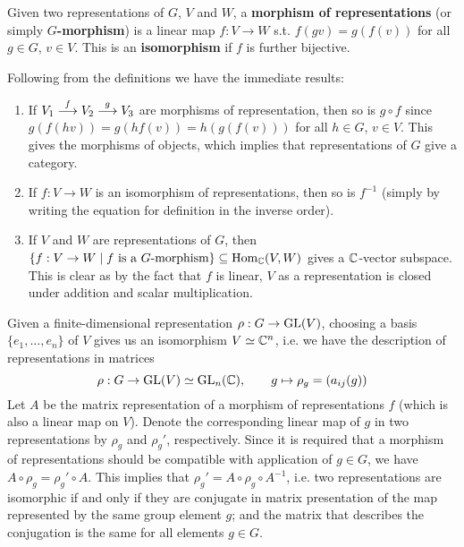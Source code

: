 \documentclass{article}
\begin{document}
\begin{definition}
    Given two representations of $G$, $V$ and $W$, a \textbf{morphism of representations} (or simply \textbf{$G$-morphism}) is a linear map $f: V \to W$ s.t. $f(gv) = g(f(v))$ for all $g \in G$, $v \in V$. This is an \textbf{isomorphism} if $f$ is further bijective.  
\end{definition}

\begin{remark}
    Following from the definitions we have the immediate results:
    \begin{enumerate}[label=\arabic*)]
        \item If $V_1 \overset{f}{\longrightarrow} V_2 \overset{g}{\longrightarrow} V_3$ are morphisms of representation, then so is $g \circ f$ since $g(f(hv)) = g(hf(v)) = h(g(f(v)))$ for all $h \in G$, $v \in V$. This gives the morphisms of objects, which implies that representations of $G$ give a category.
        \item If $f: V \to W$ is an isomorphism of representations, then so is $f^{-1}$ (simply by writing the equation for definition in the inverse order).
        \item If $V$ and $W$ are representations of $G$, then $\{ f : V \to W \mid f \text{ is a $G$-morphism} \} \subseteq \mathrm{Hom}_{\mathbb{C}}(V, W)$ gives a $\mathbb{C}$-vector subspace. This is clear as by the fact that $f$ is linear, $V$ as a representation is closed under addition and scalar multiplication.
    \end{enumerate}
\end{remark}

\begin{remark}\label{rmk: repr isom iff conjugate}
    Given a finite-dimensional representation $\rho: G \to \mathrm{GL}(V)$, choosing a basis $\{e_1, \dots, e_n\}$ of $V$ gives us an isomorphism $V \simeq \mathbb{C}^n$, i.e. we have the description of representations in matrices
    \[
        \rho: G \to \mathrm{GL}(V) \simeq \mathrm{GL}_n(\mathbb{C}), \qquad g \mapsto \rho_g = (a_{ij}(g))
    \]
    Let $A$ be the matrix representation of a morphism of representations $f$ (which is also a linear map on $V$). Denote the corresponding linear map of $g$ in two representations by $\rho_g$ and $\rho_g'$, respectively. Since it is required that a morphism of representations should be compatible with application of $g \in G$, we have $A \circ \rho_g = \rho_g' \circ A$. This implies that $\rho_g' = A \circ \rho_g \circ A^{-1}$, i.e. two representations are isomorphic if and only if they are conjugate in matrix presentation of the map represented by the same group element $g$; and the matrix that describes the conjugation is the same for all elements $g \in G$.
\end{remark}
\end{document}
